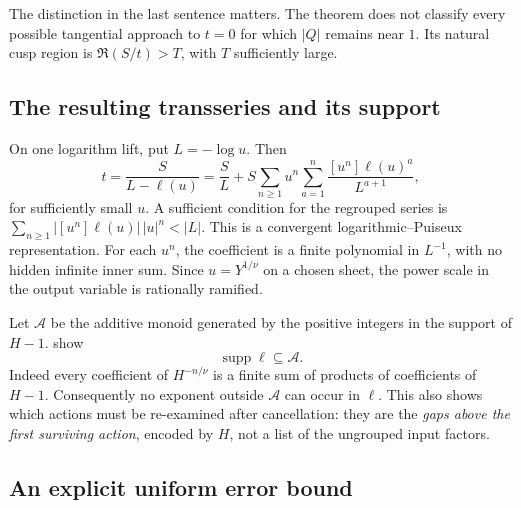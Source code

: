 The distinction in the last sentence matters.  The theorem does
not classify every possible tangential approach to \(t=0\) for
which \(|Q|\) remains near \(1\).
Its natural cusp region is
\(\Re(S/t)>T\), with \(T\) sufficiently large.

\subsection{The resulting transseries and its support}

On one logarithm lift, put \(L=-\log u\).
Then
\begin{equation}\label{eq:log-puiseux-transseries}
 t=\frac{S}{L-\ell(u)}
   =\frac{S}{L}
     +S\sum_{n\ge1}u^n
       \sum_{a=1}^n
        \frac{[u^n]\ell(u)^a}{L^{a+1}},
\end{equation}
for sufficiently small \(u\).  A sufficient condition for the
regrouped series is
\(\sum_{n\ge1}|[u^n]\ell(u)|\,|u|^n<|L|\).
This is a convergent logarithmic--Puiseux representation.
For each \(u^n\), the coefficient is a finite polynomial in
\(L^{-1}\), with no hidden infinite inner sum.
Since \(u=Y^{1/\nu}\) on a chosen sheet, the power scale in the
output variable is rationally ramified.

Let \(\mathcal A\) be the additive monoid generated by the
positive integers in the support of \(H-1\).
 show
\[
 \operatorname{supp}\ell\subseteq\mathcal A.
\]
Indeed every coefficient of \(H^{-n/\nu}\) is a finite sum of
products of coefficients of \(H-1\).  Consequently no exponent
outside \(\mathcal A\) can occur in \(\ell\).
This also shows which actions must be re-examined after
cancellation: they are the \emph{gaps above the first surviving
action}, encoded by \(H\), not a list of the ungrouped input
factors.

\subsection{An explicit uniform error bound}

